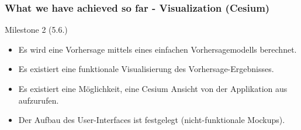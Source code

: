 \documentclass[xcolor=dvipsnames]{beamer}
\begin{document}
\begin{frame}
	\frametitle{What we have achieved so far - Visualization (Cesium)}
	\large{Milestone 2 (5.6.)}
	\normalsize
	\begin{itemize} 
		\item \color{LightGray}Es wird eine Vorhersage mittels eines einfachen Vorhersagemodells berechnet.
		\item \color{LightGray}Es existiert eine funktionale Visualisierung des Vorhersage-Ergebnisses.
		\item \color{Green}Es existiert eine Möglichkeit, eine Cesium Ansicht von der Applikation aus aufzurufen.
		\item \color{LightGray}Der Aufbau des User-Interfaces ist festgelegt (nicht-funktionale Mockups).
	\end{itemize} 
\end{frame}
\end{document}
